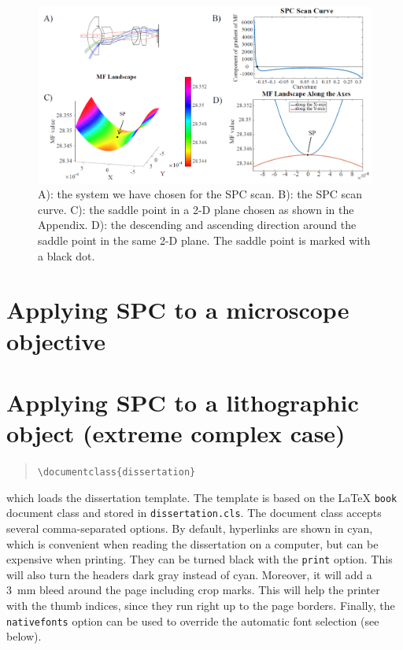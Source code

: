 \begin{figure}[h!]
    \centering
    \includegraphics[width=\textwidth]{chapter-4/figures/WAL_demo_sp.png}
    \caption{A): the system we have chosen for the SPC scan. B): the SPC scan curve. C): the saddle point in a 2-D plane chosen as shown in the Appendix. D): the descending and ascending direction around the saddle point in the same 2-D plane. The saddle point is marked with a black dot.}
    \label{fig:WAL_demo_sp}
\end{figure}

\section{Applying SPC to a microscope objective}

\section{Applying SPC to a lithographic object (extreme complex case)}


\begin{quote}
\texttt{\textbackslash documentclass\{dissertation\}}
\end{quote}
which loads the dissertation template. The template is based on the \LaTeX{} \texttt{book} document class and stored in \texttt{dissertation.cls}. The document class accepts several comma-separated options. By default, hyperlinks are shown in cyan, which is convenient when reading the dissertation on a computer, but can be expensive when printing. They can be turned black with the \texttt{print} option. This will also turn the headers dark gray instead of cyan. Moreover, it will add a 3~mm bleed around the page including crop marks. This will help the printer with the thumb indices, since they run right up to the page borders. Finally, the \texttt{nativefonts} option can be used to override the automatic font selection (see below).

